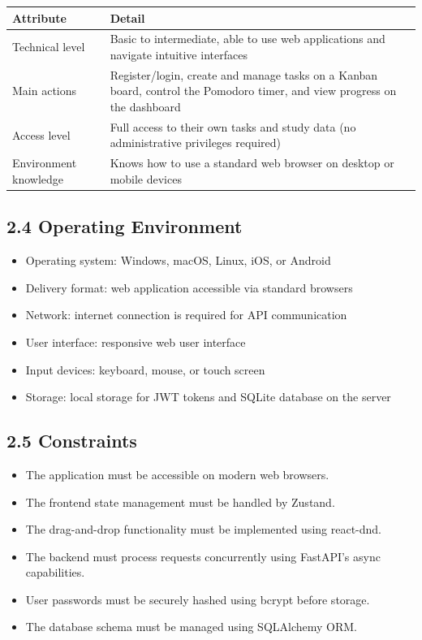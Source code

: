 \documentclass[12pt]{article}
\begin{document}
\vspace{0.3cm}
\noindent
\renewcommand{\arraystretch}{1.5}
\begin{xltabular}{\textwidth}{|l|X|}
\hline
\textbf{Attribute} & \textbf{Detail} \\ \hline
Technical level & Basic to intermediate, able to use web applications and navigate intuitive interfaces \\ \hline
Main actions & Register/login, create and manage tasks on a Kanban board, control the Pomodoro timer, and view progress on the dashboard \\ \hline
Access level & Full access to their own tasks and study data (no administrative privileges required) \\ \hline
Environment knowledge & Knows how to use a standard web browser on desktop or mobile devices \\ \hline
\end{xltabular}
\vspace{0.3cm}

\subsection*{2.4 Operating Environment}
\begin{itemize}
    \item Operating system: Windows, macOS, Linux, iOS, or Android
    \item Delivery format: web application accessible via standard browsers
    \item Network: internet connection is required for API communication
    \item User interface: responsive web user interface
    \item Input devices: keyboard, mouse, or touch screen
    \item Storage: local storage for JWT tokens and SQLite database on the server
\end{itemize}

\subsection*{2.5 Constraints}
\begin{itemize}
    \item The application must be accessible on modern web browsers.
    \item The frontend state management must be handled by Zustand.
    \item The drag-and-drop functionality must be implemented using react-dnd.
    \item The backend must process requests concurrently using FastAPI's async capabilities.
    \item User passwords must be securely hashed using bcrypt before storage.
    \item The database schema must be managed using SQLAlchemy ORM.
\end{itemize}
\end{document}
